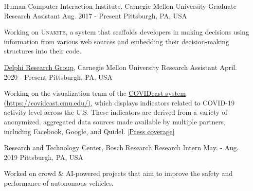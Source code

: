
\begin{cventries}
\cventry
  {Human-Computer Interaction Institute, Carnegie Mellon University} %
  {Graduate Research Assistant } %
  {Aug. 2017 - Present} %
  {Pittsburgh, PA, USA} %
  {
    \begin{cvitems} %
      \item {Working on \textsc{Unakite}, a system that scaffolds developers in making decisions using information from various web sources and embedding their decision-making structures into their code.}
    \end{cvitems}
  }

\cventry
  {
    \href{https://delphi.cmu.edu/}{Delphi Research Group}, Carnegie Mellon University} %
  {Research Assistant } %
  {April. 2020 - Present} %
  {Pittsburgh, PA, USA} %
  {
    \begin{cvitems} %
      \item {Working on the visualization team of the \href{https://covidcast.cmu.edu/}{COVIDcast system (\underline{https://covidcast.cmu.edu/})}, which displays indicators related to COVID-19 activity level across the U.S. These indicators are derived from a variety of anonymized, aggregated data sources made available by multiple partners, including Facebook, Google, and Quidel. \href{https://www.cmu.edu/news/stories/archives/2020/april/cmu-unveils-covidcast-maps.html}{[\underline{Press coverage}]}}
    \end{cvitems}
  }

\cventry
  {Research and Technology Center, Bosch Research} %
  {Research Intern } %
  {May. - Aug. 2019} %
  {Pittsburgh, PA, USA} %
  {
    \begin{cvitems} %
      \item {Worked on crowd \& AI-powered  projects that aim to improve the safety and performance of autonomous vehicles.}
    \end{cvitems}
  }


\end{cventries}
